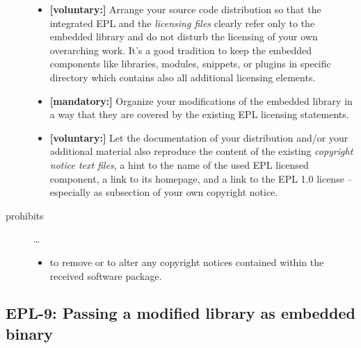 \begin{description}
\begin{itemize}
  \item \textbf{[voluntary:]} Arrange your source code distribution so that the
  integrated EPL and the \emph{licensing files} clearly refer only to the
  embedded library and do not disturb the licensing of your own overarching
  work. It's a good tradition to keep the embedded components like libraries,
  modules, snippets, or plugins in specific directory which contains also all
  additional licensing elements.
  
  \item \textbf{[mandatory:]} Organize your modifications of the embedded
  library in a way that they are covered by the existing EPL licensing
  statements. 
  
  \item \textbf{[voluntary:]} Let the documentation of your distribution and/or
  your additional material also reproduce the content of the existing
  \emph{copyright notice text files}, a hint to the name of the used EPL
  licensed component, a link to its homepage, and a link to the EPL 1.0 license
  -- especially as subsection of your own copyright notice.
 
\end{itemize}

\item[prohibits] \ldots
\begin{itemize}
  \item to remove or to alter any copyright notices contained within the
  received software package.
\end{itemize}

\end{description}


\subsection{EPL-9: Passing a modified library as embedded binary}

